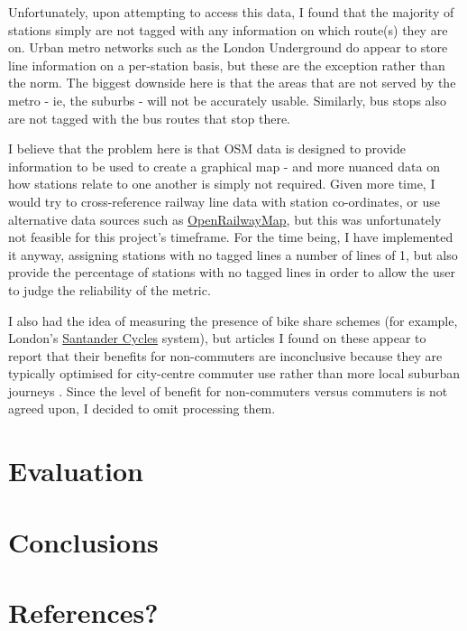 \documentclass[11pt]{article} %
\begin{document}
Unfortunately, upon attempting to access this data, I found that the majority of stations simply are not tagged with any information on which route(s) they are on. Urban metro networks such as the London Underground do appear to store line information on a per-station basis, but these are the exception rather than the norm. The biggest downside here is that the areas that are not served by the metro - ie, the suburbs - will not be accurately usable. Similarly, bus stops also are not tagged with the bus routes that stop there.

I believe that the problem here is that OSM data is designed to provide information to be used to create a graphical map - and more nuanced data on how stations relate to one another is simply not required. Given more time, I would try to cross-reference railway line data with station co-ordinates, or use alternative data sources such as \href{https://www.openrailwaymap.org/}{OpenRailwayMap}, but this was unfortunately not feasible for this project's timeframe. For the time being, I have implemented it anyway, assigning stations with no tagged lines a number of lines of 1, but also provide the percentage of stations with no tagged lines in order to allow the user to judge the reliability of the metric.

I also had the idea of measuring the presence of bike share schemes (for example, London's \href{https://tfl.gov.uk/modes/cycling/santander-cycles}{Santander Cycles} system), but articles I found on these appear to report that their benefits for non-commuters are inconclusive because they are typically optimised for city-centre commuter use rather than more local suburban journeys \parencite{Beecham2014}. Since the level of benefit for non-commuters versus commuters is not agreed upon, I decided to omit processing them.



\section{Evaluation}

\section{Conclusions}

\section{References?}
\printbibliography
\end{document}
